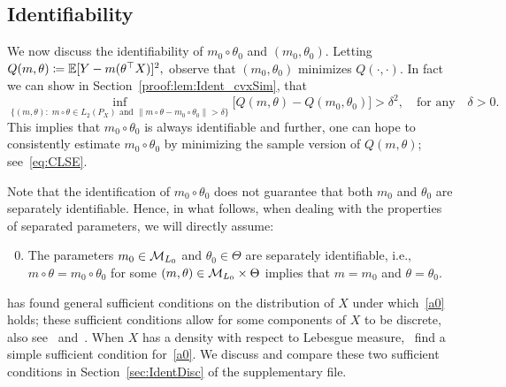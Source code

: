 \subsection{Identifiability}\label{sec:ident} We now discuss the identifiability of $m_0\circ\theta_0$ and $(m_0, \theta_0)$. Letting $Q(m,\theta) \coloneqq \mathbb{E}[Y -m(\theta^\top X)]^2,$ observe that $(m_0, \theta_0)$ minimizes $Q(\cdot, \cdot).$ In fact we can show in Section~\ref{proof:lem:Ident_cvxSim}, that
\begin{equation}\label{eq:true_mimina}
\inf_{\{(m, \theta):\; m\circ\theta \in L_2(P_X) \text{ and } \|m\circ\theta - m_0\circ\theta_0\| > \delta\}} \big[Q(m,\theta) - Q(m_0,\theta_0)\big] > \delta^2, \quad \text{for any} \quad \delta > 0.
\end{equation}
This implies that $m_0\circ\theta_0$ is always identifiable and further, one can hope to consistently estimate $m_0\circ\theta_0$ by minimizing  the sample version of $Q(m, \theta)$; see~\eqref{eq:CLSE}.

Note that the identification of $m_0\circ\theta_0$ does not guarantee that both $m_0$ and $\theta_0$ are separately identifiable. Hence, in what follows, when dealing with the properties of separated parameters, we will directly assume:
\begin{enumerate}[label=\bfseries (A\arabic*)]
\setcounter{enumi}{-1}
 \item  The parameters $m_0\in \mathcal{M}_{L_0}$ and $\theta_0\in \Theta$ are separately identifiable, i.e., $m\circ \theta = m_0\circ\theta_0$ for some $(m, \theta)\in \mathcal{M}_{L_0}\times \Theta$ implies that $m = m_0$ and $\theta= \theta_0$.\label{a0}
 \end{enumerate} 
 \citet{ICHI93} has found general sufficient conditions on the distribution of $X$ under which~\ref{a0} holds; these sufficient conditions allow for some components of $X$ to be discrete, also see~\citet[Pages 12--17]{Horowitz98} and~\citet[Proposition 8.1]{liracine07}. When $X$ has a density with respect to Lebesgue measure,~\citet[Theorem 1]{LinKul07} find a simple sufficient condition for~\ref{a0}. We  discuss and compare these two sufficient conditions in Section~\ref{sec:IdentDisc} of the supplementary file.



